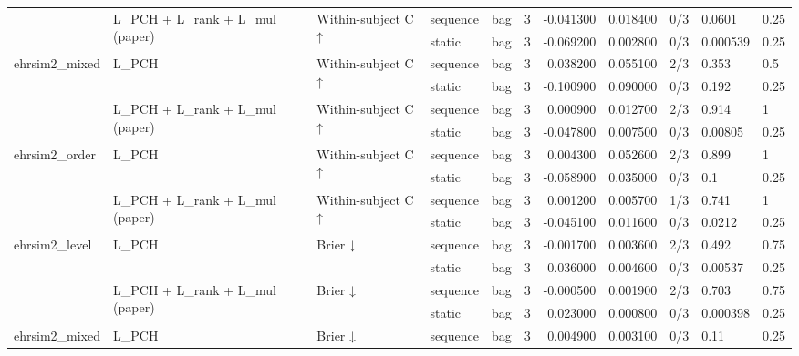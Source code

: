 \begin{tabular}{lllllrrrlll}
\cline{2-11} \cline{3-11}
 & \multirow[t]{2}{*}{L\_PCH + L\_rank + L\_mul (paper)} & \multirow[t]{2}{*}{Within-subject C ↑} & sequence & bag & 3 & -0.041300 & 0.018400 & 0/3 & 0.0601 & 0.25 \\
 &  &  & static & bag & 3 & -0.069200 & 0.002800 & 0/3 & 0.000539 & 0.25 \\
\cline{1-11} \cline{2-11} \cline{3-11}
\multirow[t]{4}{*}{ehrsim2\_mixed} & \multirow[t]{2}{*}{L\_PCH} & \multirow[t]{2}{*}{Within-subject C ↑} & sequence & bag & 3 & 0.038200 & 0.055100 & 2/3 & 0.353 & 0.5 \\
 &  &  & static & bag & 3 & -0.100900 & 0.090000 & 0/3 & 0.192 & 0.25 \\
\cline{2-11} \cline{3-11}
 & \multirow[t]{2}{*}{L\_PCH + L\_rank + L\_mul (paper)} & \multirow[t]{2}{*}{Within-subject C ↑} & sequence & bag & 3 & 0.000900 & 0.012700 & 2/3 & 0.914 & 1 \\
 &  &  & static & bag & 3 & -0.047800 & 0.007500 & 0/3 & 0.00805 & 0.25 \\
\cline{1-11} \cline{2-11} \cline{3-11}
\multirow[t]{4}{*}{ehrsim2\_order} & \multirow[t]{2}{*}{L\_PCH} & \multirow[t]{2}{*}{Within-subject C ↑} & sequence & bag & 3 & 0.004300 & 0.052600 & 2/3 & 0.899 & 1 \\
 &  &  & static & bag & 3 & -0.058900 & 0.035000 & 0/3 & 0.1 & 0.25 \\
\cline{2-11} \cline{3-11}
 & \multirow[t]{2}{*}{L\_PCH + L\_rank + L\_mul (paper)} & \multirow[t]{2}{*}{Within-subject C ↑} & sequence & bag & 3 & 0.001200 & 0.005700 & 1/3 & 0.741 & 1 \\
 &  &  & static & bag & 3 & -0.045100 & 0.011600 & 0/3 & 0.0212 & 0.25 \\
\cline{1-11} \cline{2-11} \cline{3-11}
\multirow[t]{4}{*}{ehrsim2\_level} & \multirow[t]{2}{*}{L\_PCH} & \multirow[t]{2}{*}{Brier ↓} & sequence & bag & 3 & -0.001700 & 0.003600 & 2/3 & 0.492 & 0.75 \\
 &  &  & static & bag & 3 & 0.036000 & 0.004600 & 0/3 & 0.00537 & 0.25 \\
\cline{2-11} \cline{3-11}
 & \multirow[t]{2}{*}{L\_PCH + L\_rank + L\_mul (paper)} & \multirow[t]{2}{*}{Brier ↓} & sequence & bag & 3 & -0.000500 & 0.001900 & 2/3 & 0.703 & 0.75 \\
 &  &  & static & bag & 3 & 0.023000 & 0.000800 & 0/3 & 0.000398 & 0.25 \\
\cline{1-11} \cline{2-11} \cline{3-11}
\multirow[t]{4}{*}{ehrsim2\_mixed} & \multirow[t]{2}{*}{L\_PCH} & \multirow[t]{2}{*}{Brier ↓} & sequence & bag & 3 & 0.004900 & 0.003100 & 0/3 & 0.11 & 0.25 \\

\end{tabular}
